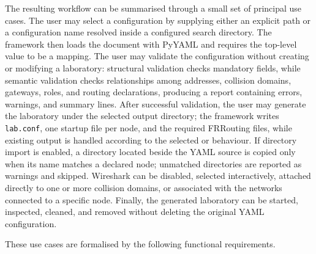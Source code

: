 The resulting workflow can be summarised through a small set of principal use
cases. The user may select a configuration by supplying either an explicit
path or a configuration name resolved inside a configured search directory.
The framework then loads the document with PyYAML and requires the top-level
value to be a mapping. The user may validate the configuration without
creating or modifying a laboratory: structural validation checks mandatory
fields, while semantic validation checks relationships among addresses,
collision domains, gateways, roles, and routing declarations, producing a
report containing errors, warnings, and summary lines. After successful
validation, the user may generate the laboratory under the selected output
directory; the framework writes \texttt{lab.conf}, one startup file per node,
and the required FRRouting files, while existing output is handled according
to the selected  or  behaviour. If directory
import is enabled, a directory located beside the YAML source is copied only
when its name matches a declared node; unmatched directories are reported as
warnings and skipped. Wireshark can be disabled, selected interactively,
attached directly to one or more collision domains, or associated with the
networks connected to a specific node. Finally, the generated laboratory can
be started, inspected, cleaned, and removed without deleting the original YAML
configuration.

These use cases are formalised by the following functional requirements.

